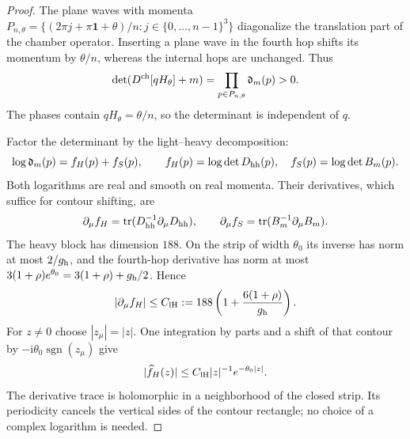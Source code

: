\begin{proof}
The plane waves with momenta
$P_{n,\theta}=\{(2\pi j+\pi\mathbf1+\theta)/n:
j\in\{0,\ldots,n-1\}^3\}$ diagonalize the translation
part of the chamber operator. Inserting a plane wave
in the fourth hop shifts its momentum by $\theta/n$,
whereas the internal hops are unchanged. Thus
\begin{equation}\label{eq:term-free-product}
 \det(D^{\rm ch}[qH_\theta]+m)
                   =\prod_{p\in P_{n,\theta}}\mathfrak d_m(p)>0.
\end{equation}
The phases contain $qH_\theta=\theta/n$, so the determinant
is independent of $q$.

Factor the determinant by the light--heavy decomposition:
\[
 \log\mathfrak d_m(p)=f_H(p)+f_S(p),\qquad
 f_H(p)=\log\det D_{\rm hh}(p),\quad
 f_S(p)=\log\det B_m(p).
\]
Both logarithms are real and smooth on real momenta.
Their derivatives, which suffice for contour shifting, are
\[
 \partial_\mu f_H=\operatorname{tr}(D_{\rm hh}^{-1}\partial_\mu D_{\rm hh}),
 \qquad
 \partial_\mu f_S=\operatorname{tr}(B_m^{-1}\partial_\mu B_m).
\]
The heavy block has dimension $188$. On the strip of
width $\theta_0$ its inverse has norm at most $2/g_{\rm h}$,
and the fourth-hop derivative has norm at most
$3(1+\rho)e^{\theta_0}=3(1+\rho)+g_{\rm h}/2$.
Hence
\[
 |\partial_\mu f_H|\le
 C_{\rm lH}:=188\left(1+\frac{6(1+\rho)}{g_{\rm h}}\right).
\]
For $z\ne0$ choose $|z_\mu|=|z|$. One integration by parts
and a shift of that contour by
$-\mathrm i\theta_0\operatorname{sgn}(z_\mu)$ give
\begin{equation}\label{eq:term-heavy-log-Fourier}
 |\widehat f_H(z)|\le C_{\rm lH}|z|^{-1}e^{-\theta_0|z|}.
\end{equation}
The derivative trace is holomorphic in a neighborhood of
the closed strip. Its periodicity cancels the vertical sides
of the contour rectangle; no choice of a complex logarithm
is needed.


\end{proof}
